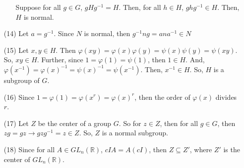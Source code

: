 \begin{itemize}
\begin{itemize}
Suppose for all $g \in G$, $gHg^{-1} = H$. Then, for all $h \in H$, $ghg^{-1} \in H$. Then, $H$ is normal. 
\end{itemize}
\item[(14)]
Let $a = g^{-1}$. Since $N$ is normal, then $g^{-1}ng = ana^{-1} \in N$
\item[(15)]
Let $x, y \in H$. Then $\varphi(xy) = \varphi(x)\varphi(y) = \psi(x)\psi(y) = \psi(xy)$. So, $xy \in H$. Further, since $1 = \varphi(1) = \psi(1)$, then $1 \in H$. And, $\varphi(x^{-1}) = \varphi(x)^{-1} = \psi(x)^{-1} = \psi(x^{-1})$. Then, $x^{-1} \in H$. So, $H$ is a subgroup of $G$.
\item[(16)]
Since $1 = \varphi(1) = \varphi(x^r) = \varphi(x)^r$, then the order of $\varphi(x)$ divides $r$.
\item[(17)]
Let $Z$ be the center of a group $G$. So for $z \in Z$, then for all $g \in G$, then $zg = gz \rightarrow gzg^{-1} = z \in Z$. So, $Z$ is a normal subgroup.
\item[(18)]
Since for all $A \in GL_n(\mathbb{R})$, $cIA = A(cI)$, then $Z \subseteq Z'$, where $Z'$ is the center of $GL_n(\mathbb{R})$. 


\end{itemize}
